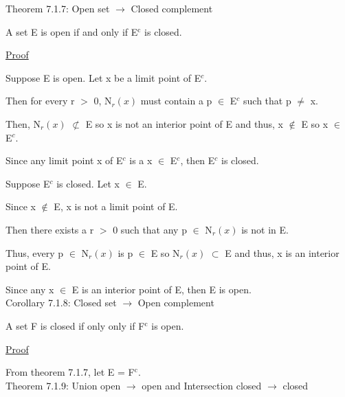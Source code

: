 \newpage

{ \color{red} Theorem 7.1.7: Open set $\rightarrow$ Closed complement } 

	\begin{adjustbox}{minipage=14cm, right, vspace=0.1cm 0cm}
		A set E is open if and only if E$^\text{c}$ is closed.
	\end{adjustbox}

{ \color{magenta} \underline{Proof} } 

	Suppose E is open. Let x be a limit point of E$^c$.

	Then for every r $>$ 0, N$_r(x)$ must contain a p $\in$ E$^c$ such that p $\neq$ x.

	Then, N$_r(x)$ $\not \subset$ E so x is not an interior point of E and
	thus, x $\not \in$ E so x $\in$ E$^c$.

	Since any limit point x of E$^c$ is a x $\in$ E$^c$, then E$^c$ is closed.

	\vspace{0.2cm}

	Suppose E$^c$ is closed. Let x $\in$ E.

	Since x $\not \in$ E, x is not a limit point of E.

	Then there exists a r $>$ 0 such that any p $\in$ N$_r(x)$ is not in E.

	Thus, every p $\in$ N$_r(x)$ is p $\in$ E so N$_r(x)$ $\subset$ E and thus,
	x is an interior point of E.

	Since any x $\in$ E is an interior point of E, then E is open. \\

{ \color{orange} Corollary 7.1.8: Closed set $\rightarrow$ Open complement } 

	\begin{adjustbox}{minipage=14cm, right, vspace=0.1cm 0cm}
		A set F is closed if only only if F$^\text{c}$ is open.
	\end{adjustbox}

{ \color{magenta} \underline{Proof} } 

	From {\color{red} theorem 7.1.7}, let E = F$^\text{c}$. \\

{ \color{red} Theorem 7.1.9: Union open $\rightarrow$ open and
Intersection closed $\rightarrow$ closed } 

